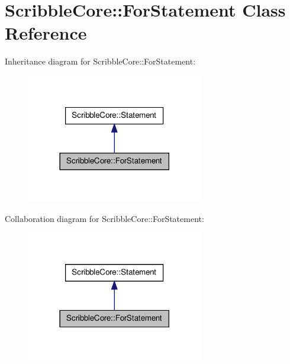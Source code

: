 \hypertarget{class_scribble_core_1_1_for_statement}{\section{Scribble\-Core\-:\-:For\-Statement Class Reference}
\label{class_scribble_core_1_1_for_statement}
}


Inheritance diagram for Scribble\-Core\-:\-:For\-Statement\-:\nopagebreak
\begin{figure}[H]
\begin{center}
\leavevmode
\includegraphics[width=218pt]{class_scribble_core_1_1_for_statement__inherit__graph}
\end{center}
\end{figure}


Collaboration diagram for Scribble\-Core\-:\-:For\-Statement\-:\nopagebreak
\begin{figure}[H]
\begin{center}
\leavevmode
\includegraphics[width=218pt]{class_scribble_core_1_1_for_statement__coll__graph}
\end{center}
\end{figure}
